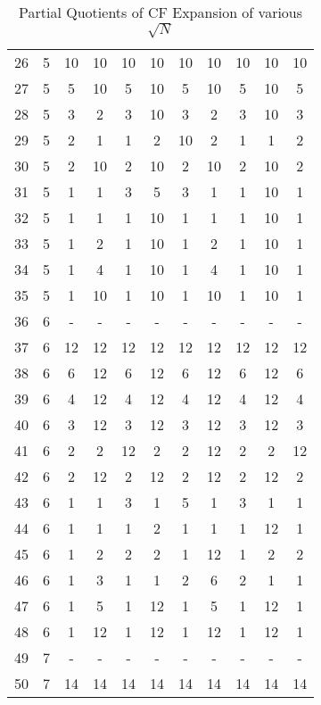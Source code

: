 \documentclass{article}
\begin{document}
\begin{table}[hp]
\begin{center}
\begin{tabular}{|c|cccccccccc|}
26 & 5 & 10 & 10 & 10 & 10 & 10 & 10 & 10 & 10 & 10 \\
27 & 5 & 5  & 10 & 5  & 10 & 5  & 10 & 5  & 10 & 5  \\
28 & 5 & 3  & 2  & 3  & 10 & 3  & 2  & 3  & 10 & 3  \\
29 & 5 & 2  & 1  & 1  & 2  & 10 & 2  & 1  & 1  & 2  \\
30 & 5 & 2  & 10 & 2  & 10 & 2  & 10 & 2  & 10 & 2  \\
31 & 5 & 1  & 1  & 3  & 5  & 3  & 1  & 1  & 10 & 1  \\
32 & 5 & 1  & 1  & 1  & 10 & 1  & 1  & 1  & 10 & 1  \\
33 & 5 & 1  & 2  & 1  & 10 & 1  & 2  & 1  & 10 & 1  \\
34 & 5 & 1  & 4  & 1  & 10 & 1  & 4  & 1  & 10 & 1  \\
35 & 5 & 1  & 10 & 1  & 10 & 1  & 10 & 1  & 10 & 1  \\
36 & 6 & -  & -  & -  & -  & -  & -  & -  & -  & -  \\
37 & 6 & 12 & 12 & 12 & 12 & 12 & 12 & 12 & 12 & 12 \\
38 & 6 & 6  & 12 & 6  & 12 & 6  & 12 & 6  & 12 & 6  \\
39 & 6 & 4  & 12 & 4  & 12 & 4  & 12 & 4  & 12 & 4  \\
40 & 6 & 3  & 12 & 3  & 12 & 3  & 12 & 3  & 12 & 3  \\
41 & 6 & 2  & 2  & 12 & 2  & 2  & 12 & 2  & 2  & 12 \\
42 & 6 & 2  & 12 & 2  & 12 & 2  & 12 & 2  & 12 & 2  \\
43 & 6 & 1  & 1  & 3  & 1  & 5  & 1  & 3  & 1  & 1  \\
44 & 6 & 1  & 1  & 1  & 2  & 1  & 1  & 1  & 12 & 1  \\
45 & 6 & 1  & 2  & 2  & 2  & 1  & 12 & 1  & 2  & 2  \\
46 & 6 & 1  & 3  & 1  & 1  & 2  & 6  & 2  & 1  & 1  \\
47 & 6 & 1  & 5  & 1  & 12 & 1  & 5  & 1  & 12 & 1  \\
48 & 6 & 1  & 12 & 1  & 12 & 1  & 12 & 1  & 12 & 1  \\
49 & 7 & -  & -  & -  & -  & -  & -  & -  & -  & -  \\
50 & 7 & 14 & 14 & 14 & 14 & 14 & 14 & 14 & 14 & 14 \\ \hline
\end{tabular}
\caption{Partial Quotients of CF Expansion of various $\sqrt{N}$}
\end{center}
\end{table}
\newpage
\end{document}

